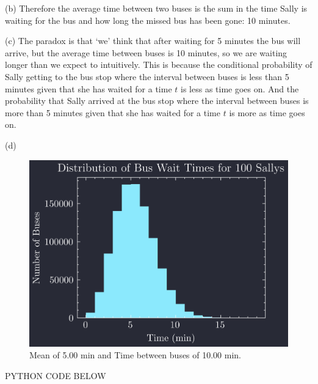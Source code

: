 \documentclass[../main.tex]{subfiles}
\begin{document}
(b) Therefore the average time between two buses is the sum in the time Sally is waiting for
the bus and how long the missed bus has been gone: 10 minutes. 

(c) The paradox is that `we' think that after waiting for 5 minutes the bus will arrive, but the 
average time between buses is 10 minutes, so we are waiting longer than we expect to intuitively.
This is because the conditional probability of Sally getting to the bus stop where the interval 
between buses is less than 5 minutes given that she has waited for a time $t$ is less as time goes
on. And the probability that Sally arrived at the bus stop where the interval between buses is more
than 5 minutes given that she has waited for a time $t$ is more as time goes on.

(d)
\begin{figure} [h]
    \centering
    \includegraphics[width=0.7\linewidth]{hw1_8d.png}
    \caption{Mean of 5.00 min and Time between buses of 10.00 min.}
    \label{fig:hw1_8d}
\end{figure}

PYTHON CODE BELOW

\end{document}
